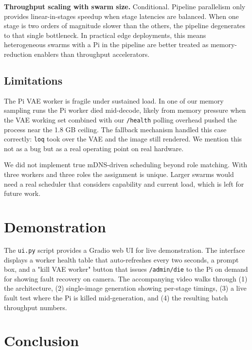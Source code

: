 \documentclass[conference]{IEEEtran}
\begin{document}
\textbf{Throughput scaling with swarm size.} Conditional. Pipeline
parallelism only provides linear-in-stages speedup when stage latencies are
balanced. When one stage is two orders of magnitude slower than the others,
the pipeline degenerates to that single bottleneck. In practical edge
deployments, this means heterogeneous swarms with a Pi in the pipeline are
better treated as memory-reduction enablers than throughput accelerators.

\subsection{Limitations}

The Pi VAE worker is fragile under sustained load. In one of our memory
sampling runs the Pi worker died mid-decode, likely from memory pressure
when the VAE working set combined with our \texttt{/health} polling
overhead pushed the process near the 1.8 GB ceiling. The fallback
mechanism handled this case correctly: \texttt{loq} took over the VAE and
the image still rendered. We mention this not as a bug but as a real
operating point on real hardware.

We did not implement true mDNS-driven scheduling beyond role matching.
With three workers and three roles the assignment is unique. Larger swarms
would need a real scheduler that considers capability and current load,
which is left for future work.

\section{Demonstration}

The \texttt{ui.py} script provides a Gradio web UI for live demonstration.
The interface displays a worker health table that auto-refreshes every two
seconds, a prompt box, and a "kill VAE worker" button that issues
\texttt{/admin/die} to the Pi on demand for showing fault recovery on
camera. The accompanying video walks through (1) the architecture, (2)
single-image generation showing per-stage timings, (3) a live fault test
where the Pi is killed mid-generation, and (4) the resulting batch
throughput numbers.

\section{Conclusion}
\end{document}
